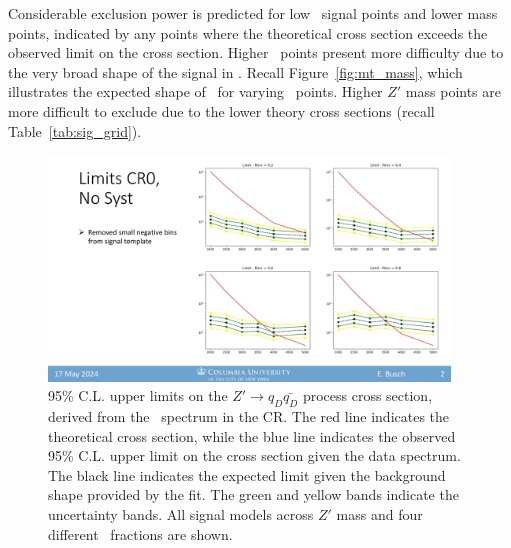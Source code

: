 Considerable exclusion power is predicted for low \rinv~signal points and lower mass points, indicated by any points where the theoretical cross section exceeds the observed limit on the cross section.
Higher \rinv~points present more difficulty due to the very broad shape of the signal in \mt.
Recall Figure~\ref{fig:mt_mass}, which illustrates the expected shape of \mt~for varying \rinv~points.
Higher $Z'$ mass points are more difficult to exclude due to the lower theory cross sections (recall Table~\ref{tab:sig_grid}).
\begin{figure}[!htbp]
\centering
   \includegraphics[width=0.95\textwidth]{figures/stats/limits_exp_1D}
    \caption{95\% C.L. upper limits on the $Z'\rightarrow q_D \bar{q_D}$ process cross section, derived from the \mt~spectrum in the CR. The red line indicates the theoretical cross section, while the blue line indicates the observed 95\% C.L. upper limit on the cross section given the data spectrum. The black line indicates the expected limit given the background shape provided by the fit. The green and yellow bands indicate the uncertainty bands. All signal models across $Z'$ mass and four different \rinv~fractions are shown. 
    \label{fig:limits_exp_1D}}
\end{figure}


